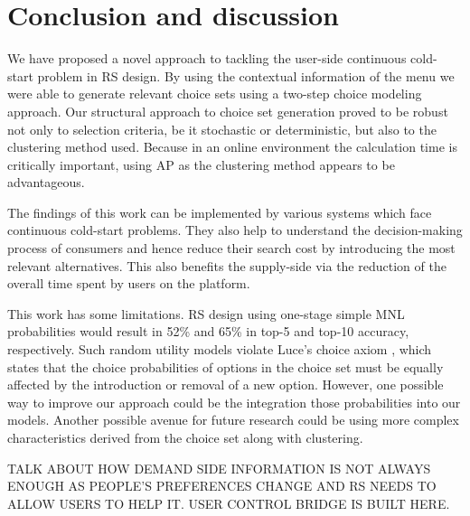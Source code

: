 \documentclass[a4paper,12pt]{article}
\begin{document}
\section{Conclusion and discussion}

We have proposed a novel approach to tackling the user-side continuous cold-start problem in RS design. By using the contextual information of the menu we were able to generate relevant choice sets using a two-step choice modeling approach. Our structural 
approach to choice set generation proved to be robust not only to selection criteria, be it stochastic or deterministic, but also to the clustering method used. Because in an online environment the calculation time is critically important, using AP as the clustering method appears to be advantageous.

The findings of this work can be implemented by various systems which face continuous cold-start problems. They also help to understand the decision-making process of consumers and hence reduce their search cost by introducing the most relevant alternatives. This also benefits the supply-side via the reduction of the overall time spent by users on the platform.

This work has some limitations. RS design using one-stage simple MNL probabilities would result in 52\% and 65\% in top-5 and top-10 accuracy, respectively. Such random utility models violate Luce's choice axiom \citep{luce2012individual}, which states that the choice probabilities of options in the choice set must be equally affected by the introduction or removal of a new option. However, one possible way to improve our approach could be the integration those probabilities into our models. Another possible avenue for future research could be using more complex characteristics derived from the choice set along with clustering.

TALK ABOUT HOW DEMAND SIDE INFORMATION IS NOT ALWAYS ENOUGH AS PEOPLE'S PREFERENCES CHANGE AND RS NEEDS TO ALLOW USERS TO HELP IT. USER CONTROL BRIDGE IS BUILT HERE.
\end{document}
